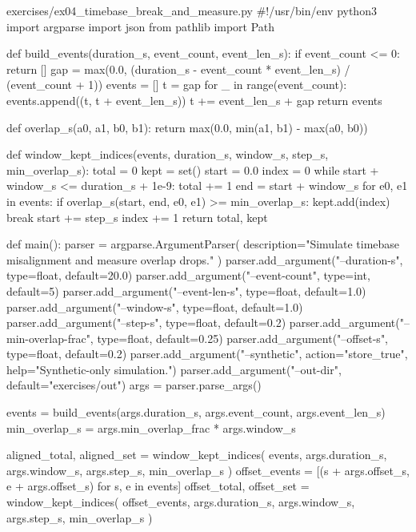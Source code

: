 \documentclass[11pt,openany]{book}
\begin{document}
\begin{filecontents*}{exercises/ex04_timebase_break_and_measure.py}
#!/usr/bin/env python3
import argparse
import json
from pathlib import Path


def build_events(duration_s, event_count, event_len_s):
    if event_count <= 0:
        return []
    gap = max(0.0, (duration_s - event_count * event_len_s) / (event_count + 1))
    events = []
    t = gap
    for _ in range(event_count):
        events.append((t, t + event_len_s))
        t += event_len_s + gap
    return events


def overlap_s(a0, a1, b0, b1):
    return max(0.0, min(a1, b1) - max(a0, b0))


def window_kept_indices(events, duration_s, window_s, step_s, min_overlap_s):
    total = 0
    kept = set()
    start = 0.0
    index = 0
    while start + window_s <= duration_s + 1e-9:
        total += 1
        end = start + window_s
        for e0, e1 in events:
            if overlap_s(start, end, e0, e1) >= min_overlap_s:
                kept.add(index)
                break
        start += step_s
        index += 1
    return total, kept


def main():
    parser = argparse.ArgumentParser(
        description="Simulate timebase misalignment and measure overlap drops."
    )
    parser.add_argument("--duration-s", type=float, default=20.0)
    parser.add_argument("--event-count", type=int, default=5)
    parser.add_argument("--event-len-s", type=float, default=1.0)
    parser.add_argument("--window-s", type=float, default=1.0)
    parser.add_argument("--step-s", type=float, default=0.2)
    parser.add_argument("--min-overlap-frac", type=float, default=0.25)
    parser.add_argument("--offset-s", type=float, default=0.2)
    parser.add_argument("--synthetic", action="store_true", help="Synthetic-only simulation.")
    parser.add_argument("--out-dir", default="exercises/out")
    args = parser.parse_args()

    events = build_events(args.duration_s, args.event_count, args.event_len_s)
    min_overlap_s = args.min_overlap_frac * args.window_s

    aligned_total, aligned_set = window_kept_indices(
        events, args.duration_s, args.window_s, args.step_s, min_overlap_s
    )
    offset_events = [(s + args.offset_s, e + args.offset_s) for s, e in events]
    offset_total, offset_set = window_kept_indices(
        offset_events, args.duration_s, args.window_s, args.step_s, min_overlap_s
    )


\end{filecontents*}
\end{document}
